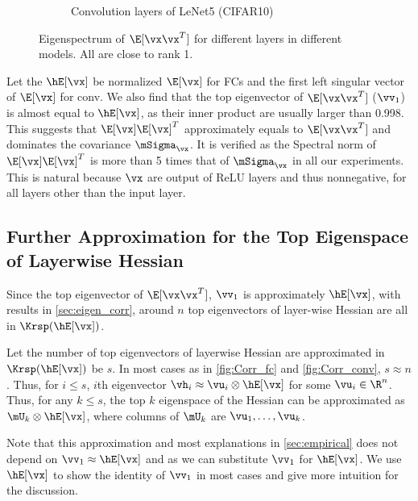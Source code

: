 \begin{figure}[th]
\begin{subfigure}[b]{0.33\textwidth}
        \caption{Convolution layers of LeNet5 (CIFAR10)}
        \label{fig:xxT_sig_lenet}
    \end{subfigure}
    \captionsetup{justification=centering}
    \caption{Eigenspectrum of $\E[\vx\vx^T]$ for different layers in different models. All are close to rank 1.}
    \label{fig:xxT}
\end{figure}

Let the $\hE[\vx]$ be normalized $\E[\vx]$ for FCs and the first left singular vector of $\E[\vx]$ for conv. We also find that the top eigenvector of $\E[\vx\vx^T]$ ($\vv_1$) is almost equal to $\hE[\vx]$, as their inner product are usually larger than 0.998. This suggests that $\E[\vx]\E[\vx]^T$ approximately equals to $\E[\vx\vx^T]$ and dominates the covariance $\mSigma_\vx$. It is verified as the Spectral norm of $\E[\vx]\E[\vx]^T$ is more than 5 times that of $\mSigma_\vx$ in all our experiments. This is natural because $\vx$ are output of ReLU layers and thus nonnegative, for all layers other than the input layer.

\subsection{Further Approximation for the Top Eigenspace of Layerwise Hessian}
\label{sec:approx_top_eig}
Since the top eigenvector of $\E[\vx\vx^T]$, $\vv_1$ is approximately $\hE[\vx]$, with results in \cref{sec:eigen_corr}, around $n$ top eigenvectors of layer-wise Hessian are all in $\Krsp(\hE[\vx])$. 

Let the number of top eigenvectors of layerwise Hessian are approximated in $\Krsp(\hE[\vx])$ be $s$. In most cases as in \cref{fig:Corr_fc} and \cref{fig:Corr_conv}, $s \approx n$. Thus, for $i \leq s$, $i$th eigenvector $\vh_i \approx \vu_i \otimes \hE[\vx]$ for some $\vu_i \in \R^n$. Thus, for any $k \leq s$, the top $k$ eigenspace of the Hessian can be approximated as $\mU_k \otimes \hE[\vx]$, where columns of $\mU_k$ are $\vu_1, \ldots, \vu_k$.

Note that this approximation and most explanations in \cref{sec:empirical} does not depend on $\vv_1 \approx \hE[\vx]$ and as we can substitute $\vv_1$ for $\hE[\vx]$. We use $\hE[\vx]$ to show the identity of $\vv_1$ in most cases and give more intuition for the discussion.

